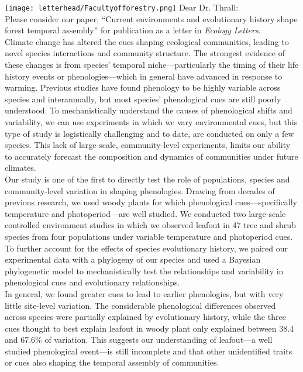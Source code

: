 \documentclass[11pt,a4paper]{article}
\begin{document}

\noindent \texttt{[image: letterhead/Facultyofforestry.png]}
\noindent Dear Dr. Thrall:
\vspace{1.5ex}\\
\noindent Please consider our paper, ``Current environments and evolutionary history shape forest temporal assembly'' for publication as a letter in \emph{Ecology Letters}. 
\vspace{1.5ex}\\ 
Climate change has altered the cues shaping ecological communities, leading to novel species interactions and community structure. The strongest evidence of these changes is from species' temporal niche---particularly the timing of their life history events or phenologies---which in general have advanced in response to warming. Previous studies have found phenology to be highly variable across species and interannually, but most species' phenological cues are still poorly understood. To mechanistically understand the causes of phenological shifts and variability, we can use experiments in which we vary environmental cues, but this type of study is logistically challenging and to date, are conducted on only a few species. This lack of large-scale, community-level experiments, limits our ability to accurately forecast the composition and dynamics of communities under future climates.
\vspace{1.5ex}\\
\noindent 
Our study is one of the first to directly test the role of populations, species and community-level variation in shaping phenologies. Drawing from decades of previous research, we used woody plants for which phenological cues---specifically temperature and photoperiod---are well studied. We conducted two large-scale controlled environment studies in which we observed leafout in 47 tree and shrub species from four populations under variable temperature and photoperiod cues.  To further account for the effects of species evolutionary history, we paired our experimental data with a phylogeny of our species and used a Bayesian phylogenetic model to mechanistically test the relationships and variability in phenological cues and evolutionary relationships.
\vspace{1.5ex}\\
\noindent  
In general, we found greater cues to lead to earlier phenologies, but with very little site-level variation. The considerable phenological differences observed across species were partially explained by evolutionary history, while the three cues thought to best explain leafout in woody plant only explained between 38.4 and 67.6\% of variation. This suggests our understanding of leafout---a well studied phenological event---is still incomplete and that other unidentified traits or cues also shaping the temporal assembly of communities. 
\end{document}
